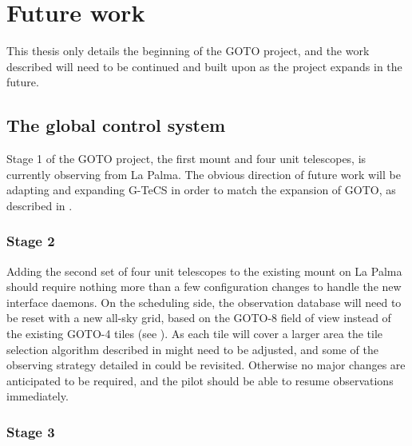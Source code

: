 \section{Future work}
\label{sec:future}
\begin{colsection}


\begin{colsection}

This thesis only details the beginning of the GOTO project, and the work described will need to be continued and built upon as the project expands in the future.

\end{colsection}


\subsection{The global control system}
\label{sec:gtecs_future}
\begin{colsection}

Stage 1 of the GOTO project, the first mount and four unit telescopes, is currently observing from La Palma. The obvious direction of future work will be adapting and expanding G-TeCS in order to match the expansion of GOTO, as described in .

\subsubsection{Stage 2}

Adding the second set of four unit telescopes to the existing mount on La Palma should require nothing more than a few configuration changes to handle the new interface daemons. On the scheduling side, the observation database will need to be reset with a new all-sky grid, based on the GOTO-8 field of view instead of the existing GOTO-4 tiles (see ). As each tile will cover a larger area the tile selection algorithm described in  might need to be adjusted, and some of the observing strategy detailed in  could be revisited. Otherwise no major changes are anticipated to be required, and the pilot should be able to resume observations immediately.

\subsubsection{Stage 3}


\end{colsection}
\end{colsection}
